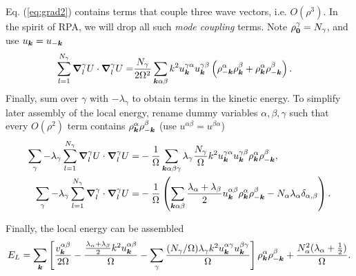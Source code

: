 Eq. (\ref{eq:grad2}) contains terms that couple three wave vectors, i.e. $O(\rho^3)$. In the spirit of RPA, we will drop all such \emph{mode coupling} terms. Note $\rho_{\boldsymbol{0}}^\gamma = N_\gamma$, and use $u_{\boldsymbol{k}}=u_{-\boldsymbol{k}}$
\begin{align}
\sum\limits_{l=1}^{N_\gamma}\boldsymbol{\nabla}_l^\gamma U\cdot\boldsymbol{\nabla}_l^\gamma U =&
\frac{N_\gamma}{2\Omega^2}\sum\limits_{\boldsymbol{k}\alpha\beta} k^2u_{\boldsymbol{k}}^{\gamma\alpha}u_{\boldsymbol{k}}^{\gamma\beta} \left( \rho_{-\boldsymbol{k}}^\alpha\rho_{\boldsymbol{k}}^\beta + \rho_{\boldsymbol{k}}^\alpha\rho_{-\boldsymbol{k}}^\beta \right). \label{eq:grad2_rpa}
\end{align}
Finally, sum over $\gamma$ with $-\lambda_\gamma$ to obtain terms in the kinetic energy. To simplify later assembly of the local energy, rename dummy variables $\alpha, \beta, \gamma$ such that every $O(\rho^2)$ term contains $\rho_{\boldsymbol{k}}^\alpha\rho_{-\boldsymbol{k}}^\beta$ (use $u^{\alpha\beta}=u^{\beta\alpha}$)
\begin{align}
\sum\limits_{\gamma}-\lambda_\gamma\sum\limits_{l=1}^{N_\gamma}\boldsymbol{\nabla}_l^\gamma U\cdot\boldsymbol{\nabla}_l^\gamma U =&-\frac{1}{\Omega}
\sum\limits_{\boldsymbol{k}\alpha\beta\gamma} \lambda_\gamma\frac{N_\gamma}{\Omega}
k^2u_{\boldsymbol{k}}^{\gamma\alpha}u_{\boldsymbol{k}}^{\gamma\beta} \rho_{\boldsymbol{k}}^\alpha\rho_{-\boldsymbol{k}}^\beta, \\
\sum\limits_{\gamma}-\lambda_\gamma\sum\limits_{l=1}^{N_\gamma}\boldsymbol{\nabla}_l^\gamma \cdot\boldsymbol{\nabla}_l^\gamma U =& -\frac{1}{\Omega}\left( 
\sum\limits_{\boldsymbol{k}\alpha\beta} \frac{\lambda_\alpha+\lambda_\beta}{2} u_{\boldsymbol{k}}^{\alpha\beta}\rho_{\boldsymbol{k}}^\alpha\rho_{-\boldsymbol{k}}^\beta -N_\alpha\lambda_\alpha\delta_{\alpha,\beta} \right).
\end{align}

Finally, the local energy can be assembled
\begin{align}
E_L = \sum\limits_{\boldsymbol{k}}\left[\frac{v^{\alpha\beta}_{\boldsymbol{k}}}{2\Omega} - 
\frac{\frac{\lambda_\alpha+\lambda_\beta}{2}k^2u_{\boldsymbol{k}}^{\alpha\beta}}{\Omega} -
\sum\limits_\gamma \frac{(N_\gamma/\Omega)\lambda_\gamma k^2u_{\boldsymbol{k}}^{\alpha\gamma}u_{\boldsymbol{k}}^{\beta\gamma}}{\Omega}\right]\rho_{\boldsymbol{k}}^\alpha\rho_{-\boldsymbol{k}}^\beta + \frac{N_\alpha^2(\lambda_\alpha+\frac{1}{2})}{\Omega}.
\end{align}

